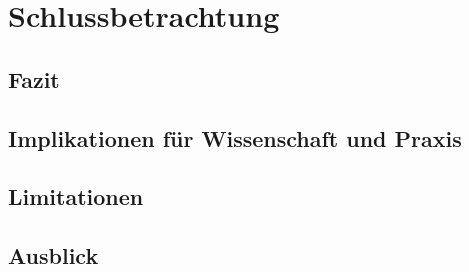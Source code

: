 
\chapter{Schlussbetrachtung}

\section{Fazit}

\section{Implikationen für Wissenschaft und Praxis}

\section{Limitationen}

\section{Ausblick}




